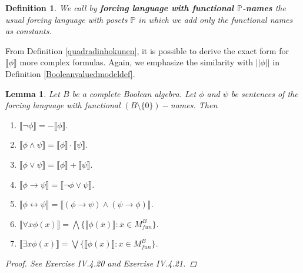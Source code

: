 \documentclass[10pt,longbibliography]{article}
\newtheorem{Def}[Theo]{Definition}
\newtheorem{Lemma}[Theo]{Lemma}
\newcommand{\Po}{\mathbb{P}}
\newcommand{\xdot}{\overset{.}{x}}
\newcommand{\lb}{\llbracket}
\newcommand{\rb}{\rrbracket}
\begin{document}
\begin{Def}
	We call by \textbf{forcing language with functional  $\Po$-names} the usual forcing language with posets $\Po$ in which we add only the functional names as constants.
\end{Def}
From Definition \ref{quadradinhokunen}, it is possible to derive the exact form for $\lb \phi \rb$ more complex formulas. Again, we emphasize the similarity with $||\phi||$ in {Definition \ref{Booleanvaluedmodeldef}}.

\begin{Lemma}\label{quadradinhokunenproperty}
	Let $B$ be a complete Boolean algebra. Let $\phi$ and $\psi$ be sentences of the forcing language with functional $(B \setminus \{0\})-$names. Then
	\begin{enumerate}
		\item $\lb \neg \phi \rb = - \lb \phi \rb.$
		
		\item $\lb \phi \land \psi \rb = \lb \phi \rb \cdot \lb \psi \rb.$
		
		\item $\lb \phi \lor \psi \rb = \lb \phi \rb + \lb \psi \rb.$
		
		\item $\lb \phi \to \psi \rb = \lb \neg \phi \lor \psi \rb$.
		
		\item $\lb \phi \leftrightarrow \psi \rb = \lb(\phi \to \psi)\land(\psi \to \phi) \rb$.
		
		\item $\lb \forall x \phi(x) \rb = \bigwedge \{\lb \phi(\xdot)\rb: \xdot \in M^{B}_{fun}\}.$
		
		\item $\lb \exists x \phi(x) \rb = \bigvee \{\lb \phi(\xdot) \rb: \xdot \in M^{B}_{fun} \}$.
	\end{enumerate}
\begin{proof}
	See \cite{Kunen11} Exercise IV.4.20 and Exercise IV.4.21.
\end{proof}
\end{Lemma}
\end{document}
